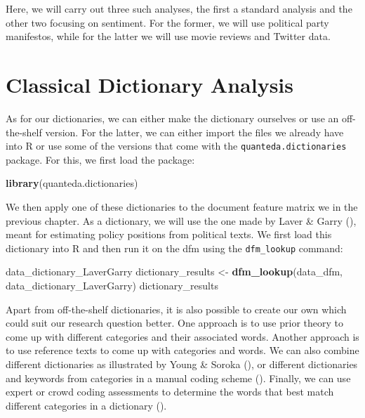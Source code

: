 \documentclass[
]{book}
\newenvironment{Shaded}{\begin{snugshade}}{\end{snugshade}}
\newcommand{\FunctionTok}[1]{\textcolor[rgb]{0.13,0.29,0.53}{\textbf{#1}}}
\newcommand{\NormalTok}[1]{#1}
\newcommand{\OtherTok}[1]{\textcolor[rgb]{0.56,0.35,0.01}{#1}}
\begin{document}
Here, we will carry out three such analyses, the first a standard analysis and the other two focusing on sentiment. For the former, we will use political party manifestos, while for the latter we will use movie reviews and Twitter data.

\section{Classical Dictionary Analysis}\label{classical-dictionary-analysis}

As for our dictionaries, we can either make the dictionary ourselves or use an off-the-shelf version. For the latter, we can either import the files we already have into R or use some of the versions that come with the \texttt{quanteda.dictionaries} package. For this, we first load the package:

\begin{Shaded}
\begin{Highlighting}[]
\FunctionTok{library}\NormalTok{(quanteda.dictionaries)}
\end{Highlighting}
\end{Shaded}

We then apply one of these dictionaries to the document feature matrix we in the previous chapter. As a dictionary, we will use the one made by Laver \& Garry (), meant for estimating policy positions from political texts. We first load this dictionary into R and then run it on the dfm using the \texttt{dfm\_lookup} command:

\begin{Shaded}
\begin{Highlighting}[]
\NormalTok{data\_dictionary\_LaverGarry}
\NormalTok{dictionary\_results }\OtherTok{\textless{}{-}} \FunctionTok{dfm\_lookup}\NormalTok{(data\_dfm, data\_dictionary\_LaverGarry)}
\NormalTok{dictionary\_results}
\end{Highlighting}
\end{Shaded}

Apart from off-the-shelf dictionaries, it is also possible to create our own which could suit our research question better. One approach is to use prior theory to come up with different categories and their associated words. Another approach is to use reference texts to come up with categories and words. We can also combine different dictionaries as illustrated by Young \& Soroka (), or different dictionaries and keywords from categories in a manual coding scheme (). Finally, we can use expert or crowd coding assessments to determine the words that best match different categories in a dictionary ().
\end{document}
